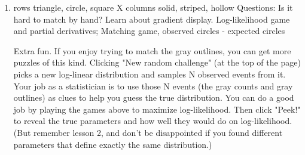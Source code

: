 \documentclass[11pt,letterpaper]{article}
\begin{document}
\begin{enumerate}
\item %
rows {triangle, circle, square} X columns {solid, striped, hollow}
Questions: Is it hard to match by hand?  Learn about gradient display.
Log-likelihood game and partial derivatives; Matching game, observed circles - expected circles

Extra fun. If you enjoy trying to match the gray outlines, you can get more puzzles of this kind. Clicking "New random challenge" (at the top of the page) picks a new log-linear distribution and samples N observed events from it. Your job as a statistician is to use those N events (the gray counts and gray outlines) as clues to help you guess the true distribution. You can do a good job by playing the games above to maximize log-likelihood. Then click "Peek!" to reveal the true parameters and how well they would do on log-likelihood. (But remember lesson 2, and don't be disappointed if you found different parameters that define exactly the same distribution.)


\end{enumerate}
\end{document}
